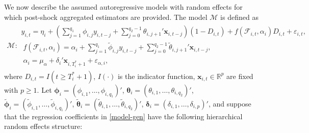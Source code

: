 \documentclass[11pt]{article}
\newcommand{\R}{\mathbb{R}}
\newcommand{\x}{\textbf{x}}
\def\mbf#1{\mathbf{#1}} %
\def\t#1{\tilde{#1}} %
\def\mc#1{\mathcal{#1}} %
\def\mc#1{\mathcal{#1}}
\theoremstyle{definition}
\begin{document}
We now describe the assumed autoregressive models with random effects for which post-shock aggregated estimators are provided. The model $\mc{M}$ is defined as
\begin{align}
\mc{M} \colon \begin{array}{l}
  y_{i,t} = \eta_i + \left(\sum_{j=1}^{q_1}\phi_{i,j}y_{i, t-j} + \sum_{j=0}^{q_2-1}\theta_{i,j+1}'\mbf{x}_{i,t-j}\right)(1 - D_{i,t}) + f(\mathcal{F}_{i,t},\alpha_i)D_{i,t} + \varepsilon_{i,t},\\[.2cm]
  \; f(\mc{F}_{i,t},\alpha_i) = \alpha_i +  \sum_{j=1}^{q_{1}}\t\phi_{i,j}y_{i, t-j} + \sum_{j=0}^{q_2-1}\t\theta_{i,j+1}'\mbf{x}_{i,t-j}, \\[.2cm]
  \; \alpha_i = \mu_{\alpha} + \delta_i'\mbf{x}_{i, T_i^*+1} + \varepsilon_{\alpha, i},
\end{array}\label{model-gen}
\end{align}
where $D_{i,t} = I(t \geq T_i^* + 1)$, $I(\cdot)$ is the indicator function, $\x_{i,t} \in \R^{p}$ are fixed with $p \geq 1$. Let 
$\mathbf{\phi}_i = (\phi_{i,1},\ldots,\phi_{i,q_1})'$, 
$\mathbf{\theta}_i = (\theta_{i,1},\ldots,\theta_{i,q_2})'$, 
$\tilde{\mathbf{\phi}}_i = (\t\phi_{i,1},\ldots,\t\phi_{i,q_{1}})'$, 
$\tilde{\mathbf{\theta}}_i = (\t\theta_{i,1},\ldots,\t\theta_{i, q_{2}})'$, 
$\mathbf{\delta}_i = (\delta_{i,1},\ldots,\delta_{i,p})'$, 
and suppose that the regression coefficients in \eqref{model-gen} have the following hierarchical random effects structure: 
\end{document}

